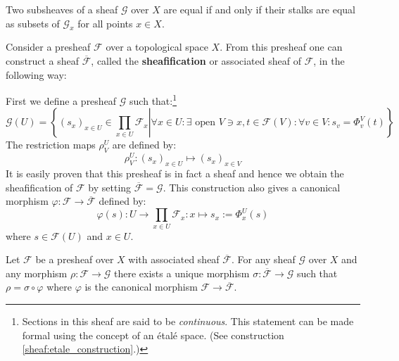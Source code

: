 	\begin{property}
		Two subsheaves of a sheaf $\mathcal{G}$ over $X$ are equal if and only if their stalks are equal as subsets of $\mathcal{G}_x$ for all points $x\in X$.
	\end{property}
	
	\begin{construct}
		Consider a presheaf $\mathcal{F}$ over a topological space $X$. From this presheaf one can construct a sheaf $\overline{\mathcal{F}}$, called the \textbf{sheafification} or associated sheaf of $\mathcal{F}$, in the following way:
		
		First we define a presheaf $\mathcal{G}$ such that:\footnote{Sections in this sheaf are said to be \textit{continuous}. This statement can be made formal using the concept of an \'etal\'e space. (See construction \ref{sheaf:etale_construction}.)}
		\begin{equation}
			\mathcal{G}(U) = \left\{\left.(s_x)_{x\in U}\in\prod_{x\in U}\mathcal{F}_x\right\vert\forall x\in U: \exists\text{ open }V\ni x, t\in\mathcal{F}(V): \forall v\in V: s_v = \Phi^V_v(t)\right\}
		\end{equation}
		The restriction maps $\rho^U_V$ are defined by:
		\begin{equation}
			\rho^U_V:(s_x)_{x\in U}\mapsto(s_x)_{x\in V}
		\end{equation}
		It is easily proven that this presheaf is in fact a sheaf and hence we obtain the sheafification of $\mathcal{F}$ by setting $\overline{\mathcal{F}} = \mathcal{G}$. This construction also gives a canonical morphism $\varphi:\mathcal{F}\rightarrow\overline{\mathcal{F}}$ defined by:
		\begin{equation}
			\varphi(s):U\rightarrow\prod_{x\in U}\mathcal{F}_x:x \mapsto s_x := \Phi^U_x(s)
		\end{equation}
		where $s\in\mathcal{F}(U)$ and $x\in U$.
	\end{construct}
	
	\begin{uproperty}
		Let $\mathcal{F}$ be a presheaf over $X$ with associated sheaf $\overline{\mathcal{F}}$. For any sheaf $\mathcal{G}$ over $X$ and any morphism $\rho:\mathcal{F}\rightarrow\mathcal{G}$ there exists a unique morphism $\sigma:\overline{\mathcal{F}}\rightarrow\mathcal{G}$ such that $\rho = \sigma\circ\varphi$ where $\varphi$ is the canonical morphism $\mathcal{F}\rightarrow\overline{\mathcal{F}}$.
	\end{uproperty}
	
